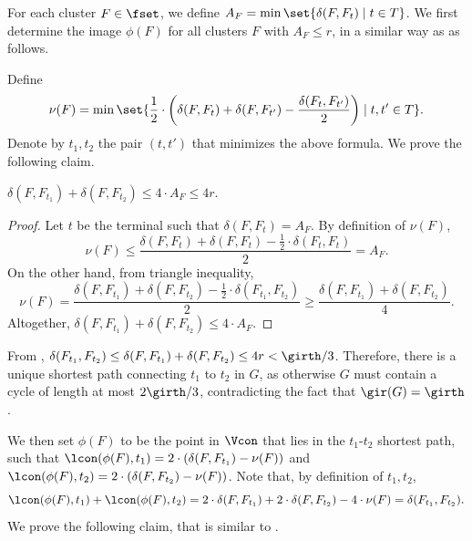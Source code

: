 For each cluster $F\in \fset$, we define $A_F=\min\set{\delta(F,F_t)\mid t\in T}$.
We first determine the image $\phi(F)$ for all clusters $F$ with $A_F \le r$, in a similar way as  as follows.

Define \[\nu(F)=\min\set{\frac{1}{2}\cdot \bigg(\delta(F,F_t)+\delta(F,F_{t'})-\frac{\delta(F_t,F_{t'})}{2}\bigg)\mid t,t'\in T}.\]
Denote by $t_1,t_2$ the pair $(t,t')$ that minimizes the above formula. We prove the following claim.

\begin{claim} \label{clm:g-tree}
$\delta(F,F_{t_1}) + \delta(F,F_{t_2}) \le 4\cdot A_F \le 4r$.
\end{claim}
\begin{proof}
Let $t$ be the terminal such that $\delta(F,F_t) = A_F$. By definition of $\nu(F)$, 
$$\nu(F) \le \frac{\delta(F,F_t)+\delta(F,F_t)- \frac{1}{2}\cdot \delta(F_t,F_t)}{2} = A_F.$$ 
On the other hand, from triangle inequality, %
$$\nu(F) = \frac{\delta(F,F_{t_1})+\delta(F,F_{t_2}) - \frac 1 2\cdot \delta(F_{t_1},F_{t_2})}{2} \ge \frac{\delta(F,F_{t_1})+\delta(F,F_{t_2})}{4}.$$ Altogether, $\delta(F,F_{t_1})+\delta(F,F_{t_2}) \le 4\cdot A_F$. 
\end{proof}

From , $\delta(F_{t_1},F_{t_2}) \le \delta(F,F_{t_1}) + \delta(F,F_{t_2})\le 4r < \girth/3$. Therefore, there is a unique shortest path connecting $t_1$ to $t_2$ in $G$, as otherwise $G$ must contain a cycle of length at most $2\girth/3$, contradicting the fact that $\gir(G)=\girth$. %
 
We then set $\phi(F)$ to be the point in $\Vcon$ that lies in the $t_1$-$t_2$ shortest path, such that $\lcon(\phi(F),t_1) = 2\cdot (\delta(F,F_{t_1}) - \nu(F))$ and $\lcon(\phi(F),t_2) = 2\cdot (\delta(F,F_{t_2}) - \nu(F))$. Note that, by definition of $t_1,t_2$,
\[
\lcon(\phi(F),t_1)+\lcon(\phi(F),t_2)=2\cdot \delta(F,F_{t_1}) +2\cdot \delta(F,F_{t_2}) - 4\cdot \nu(F)=\delta(F_{t_1},F_{t_2}).
\] 
We prove the following claim, that is similar to .
    

